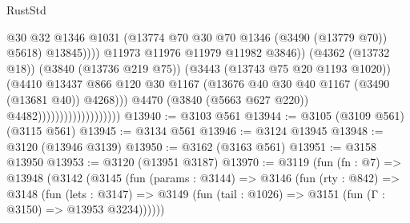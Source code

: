 \begin{lexlean}{RustStd}
\begin{coremodule}
                                                        @30
                                                        @32
                                                        @1346
                                                        @1031
                                                        (@13774
                                                          @70
                                                          @30
                                                          @70
                                                          @1346
                                                          (@3490 (@13779 @70))
                                                          @5618)
                                                        @13845))))
                                                @11973
                                                @11976
                                                @11979
                                                @11982
                                                @3846))
                                            (@4362 (@13732 @18))
                                            (@3840 (@13736 @219 @75))
                                            (@3443 (@13743 @75 @20 @1193 @1020))
                                            (@4410
                                              @13437
                                              @866
                                              @120
                                              @30
                                              @1167
                                              (@13676
                                                @40
                                                @30
                                                @40
                                                @1167
                                                (@3490 (@13681 @40))
                                                @4268)))
                                          @4470
                                          (@3840 (@5663 @627 @220))
                                          @4482)))))))))))))))))))
@13940 := @3103 @561
@13944 := @3105 (@3109 @561) (@3115 @561)
@13945 := @3134 @561
@13946 := @3124 @13945
@13948 := @3120 (@13946 @3139)
@13950 := @3162 (@3163 @561)
@13951 := @3158 @13950
@13953 := @3120 (@13951 @3187)
@13970 := @3119
    (fun (fn : @7) =>
    @13948
      (@3142
        (@3145
          (fun (params : @3144) =>
          @3146
            (fun (rty : @842) =>
            @3148
              (fun (lets : @3147) =>
              @3149 (fun (tail : @1026) => @3151 (fun (Γ : @3150) => @13953 @3234))))))

\end{coremodule}
\end{lexlean}
